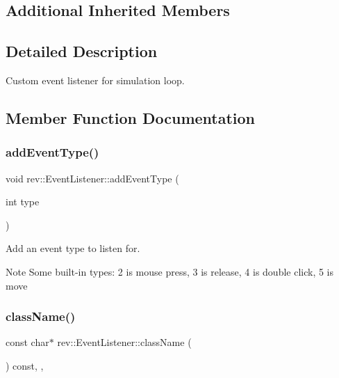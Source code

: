 \subsection*{Additional Inherited Members}


\subsection{Detailed Description}
Custom event listener for simulation loop. 

\subsection{Member Function Documentation}
\mbox{\label{classrev_1_1_event_listener_ac7d395e1e2f55c894b44c49bade80262}} 
\subsubsection{\texorpdfstring{addEventType()}{addEventType()}}
{\footnotesize\ttfamily void rev\+::\+Event\+Listener\+::add\+Event\+Type (\begin{DoxyParamCaption}\item[{int}]{type }\end{DoxyParamCaption})}



Add an event type to listen for. 

\begin{DoxyNote}{Note}
Some built-\/in types\+: 2 is mouse press, 3 is release, 4 is double click, 5 is move 
\end{DoxyNote}
\mbox{\label{classrev_1_1_event_listener_a769859dbbf444d1a029ac563ce63806c}} 
\subsubsection{\texorpdfstring{className()}{className()}}
{\footnotesize\ttfamily const char$\ast$ rev\+::\+Event\+Listener\+::class\+Name (\begin{DoxyParamCaption}{ }\end{DoxyParamCaption}) const\hspace{0.3cm}{\ttfamily [inline]}, {\ttfamily [override]}, {\ttfamily [virtual]}}



